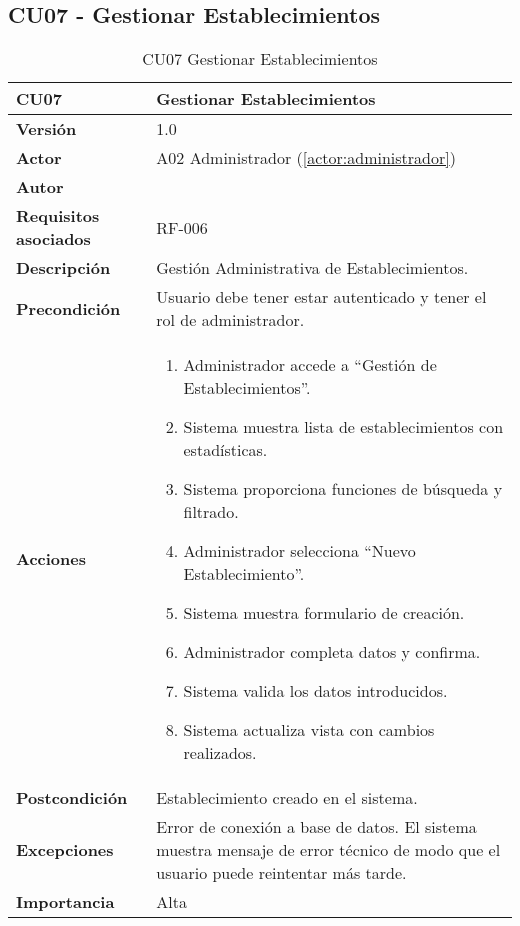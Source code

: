 \subsection{CU07 - Gestionar Establecimientos}

\begin{table}[H]
	\centering
	\begin{tabularx}{\linewidth}{ p{} p{} }
		\toprule
		\textbf{CU07}    & \textbf{Gestionar Establecimientos} \\
		\toprule
		\textbf{Versión}              & 1.0    \\
		\textbf{Actor}                & A02 Administrador (\ref{actor:administrador}) \\
		\textbf{Autor}                & \nombre \\
		\textbf{Requisitos asociados} & RF-006 \\
		\textbf{Descripción}          & Gestión Administrativa de Establecimientos. \\
		\textbf{Precondición}         & Usuario debe tener estar autenticado y tener el rol de administrador. \\
		\textbf{Acciones}             &
		\begin{enumerate}
			\def\labelenumi{\arabic{enumi}.}
			\tightlist
			\item Administrador accede a ``Gestión de Establecimientos''.
            \item Sistema muestra lista de establecimientos con estadísticas.
            \item Sistema proporciona funciones de búsqueda y filtrado.
            \item Administrador selecciona ``Nuevo Establecimiento''.
 	    \item Sistema muestra formulario de creación.
            \item Administrador completa datos y confirma.
            \item Sistema valida los datos introducidos.
            \item Sistema actualiza vista con cambios realizados.
		\end{enumerate}\\
		\textbf{Postcondición}        & Establecimiento creado en el sistema.\\
		\textbf{Excepciones}          & Error de conexión a base de datos. El sistema muestra mensaje de error técnico de modo que el usuario puede reintentar más tarde.\\
		\textbf{Importancia}          & Alta \\
		\bottomrule
	\end{tabularx}
	\caption{CU07 Gestionar Establecimientos}
	\label{cu:gestionar-establecimientos}
\end{table}

